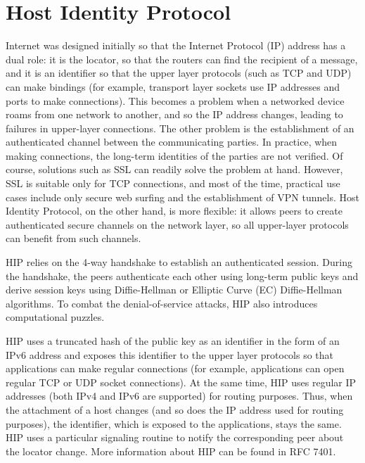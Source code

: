 \section{Host Identity Protocol}

Internet was designed initially so that the Internet Protocol (IP) address has a dual role: it 
is the locator, so that the routers can find the recipient of a message, and it is an identifier 
so that the upper layer protocols (such as TCP and UDP) can make bindings (for example, transport 
layer sockets use IP addresses and ports to make connections). This becomes a problem when a networked 
device roams from one network to another, and so the IP address changes, leading to failures in 
upper-layer connections. The other problem is the establishment of an authenticated channel between 
the communicating parties. In practice, when making connections, the long-term identities of the parties 
are not verified. Of course, solutions such as SSL can readily solve the problem at hand. However, SSL 
is suitable only for TCP connections, and most of the time, practical use cases include only secure web 
surfing and the establishment of VPN tunnels. Host Identity Protocol, on the other hand, is more flexible: 
it allows peers to create authenticated secure channels on the network layer, so all upper-layer protocols 
can benefit from such channels.

HIP relies on the 4-way handshake to establish an authenticated session. During the handshake, the 
peers authenticate each other using long-term public keys and derive session keys using Diffie-Hellman 
or Elliptic Curve (EC) Diffie-Hellman algorithms. To combat the denial-of-service attacks, HIP also 
introduces computational puzzles. 

HIP uses a truncated hash of the public key as an identifier in the form of an IPv6 address and 
exposes this identifier to the upper layer protocols so that applications can make regular 
connections (for example, applications can open regular TCP or UDP socket connections). At the 
same time, HIP uses regular IP addresses (both IPv4 and IPv6 are supported) for routing purposes. 
Thus, when the attachment of a host changes (and so does the IP address used for routing purposes), 
the identifier, which is exposed to the applications, stays the same. HIP uses a particular 
signaling routine to notify the corresponding peer about the locator change. More information 
about HIP can be found in RFC 7401. 
